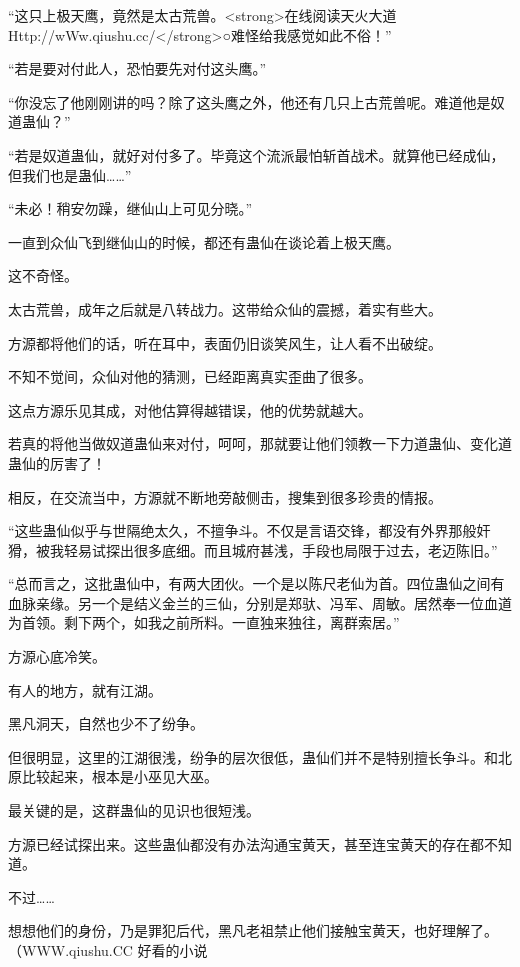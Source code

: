 
\begin{this_body}

“这只上极天鹰，竟然是太古荒兽。<strong>在线阅读天火大道Http://wWw.qiushu.cc/</strong>○难怪给我感觉如此不俗！”

“若是要对付此人，恐怕要先对付这头鹰。”

“你没忘了他刚刚讲的吗？除了这头鹰之外，他还有几只上古荒兽呢。难道他是奴道蛊仙？”

“若是奴道蛊仙，就好对付多了。毕竟这个流派最怕斩首战术。就算他已经成仙，但我们也是蛊仙……”

“未必！稍安勿躁，继仙山上可见分晓。”

一直到众仙飞到继仙山的时候，都还有蛊仙在谈论着上极天鹰。

这不奇怪。

太古荒兽，成年之后就是八转战力。这带给众仙的震撼，着实有些大。

方源都将他们的话，听在耳中，表面仍旧谈笑风生，让人看不出破绽。

不知不觉间，众仙对他的猜测，已经距离真实歪曲了很多。

这点方源乐见其成，对他估算得越错误，他的优势就越大。

若真的将他当做奴道蛊仙来对付，呵呵，那就要让他们领教一下力道蛊仙、变化道蛊仙的厉害了！

相反，在交流当中，方源就不断地旁敲侧击，搜集到很多珍贵的情报。

“这些蛊仙似乎与世隔绝太久，不擅争斗。不仅是言语交锋，都没有外界那般奸猾，被我轻易试探出很多底细。而且城府甚浅，手段也局限于过去，老迈陈旧。”

“总而言之，这批蛊仙中，有两大团伙。一个是以陈尺老仙为首。四位蛊仙之间有血脉亲缘。另一个是结义金兰的三仙，分别是郑驮、冯军、周敏。居然奉一位血道为首领。剩下两个，如我之前所料。一直独来独往，离群索居。”

方源心底冷笑。

有人的地方，就有江湖。

黑凡洞天，自然也少不了纷争。

但很明显，这里的江湖很浅，纷争的层次很低，蛊仙们并不是特别擅长争斗。和北原比较起来，根本是小巫见大巫。

最关键的是，这群蛊仙的见识也很短浅。

方源已经试探出来。这些蛊仙都没有办法沟通宝黄天，甚至连宝黄天的存在都不知道。

不过……

想想他们的身份，乃是罪犯后代，黑凡老祖禁止他们接触宝黄天，也好理解了。（WWW.qiushu.CC 好看的小说


\end{this_body}
